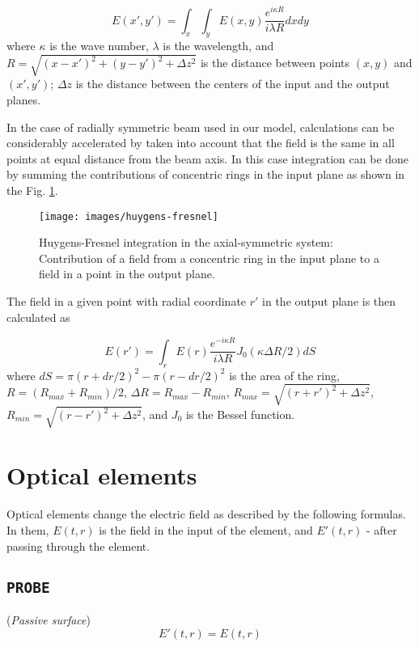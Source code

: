 \documentclass{report}
\begin{document}
\begin{equation}
E(x', y') = \int_x\int_y E(x,y) \frac{e^{i\kappa R}}{i\lambda R} dx dy
\end{equation}
where $\kappa$ is the wave number, $\lambda$ is the wavelength, and $R=\sqrt{(x-x')^2+(y-y')^2+\Delta z^2}$ is the distance between points $(x,y)$ and $(x',y')$; $\Delta z$ is the distance between the centers of the input and the output planes.

In the case of radially symmetric beam used in our model, calculations can be considerably accelerated by taken into account that the field is the same in all points at equal distance from the beam axis. In this case integration can be done by summing the contributions of concentric rings in the input plane as shown in the Fig. \ref{fig:Huygens-Fresnel}.

\begin{figure}[ht]
\centering
\texttt{[image: images/huygens-fresnel]}
\caption{Huygens-Fresnel integration in the axial-symmetric system: Contribution of a field from a concentric ring in the input plane to a field in a point in the output plane.}\label{fig:Huygens-Fresnel}
\end{figure}

The field in a given point with radial coordinate $r'$ in the output plane is then calculated as

\begin{equation}
E(r') = \int_{r}E(r)\frac{e^{-i\kappa R}}{i\lambda R} J_0(\kappa \Delta R/2) dS
\end{equation}
where $dS = \pi(r+dr/2)^2-\pi(r-dr/2)^2$ is the area of the ring, $R=(R_{max}+R_{min})/2$, $\Delta R=R_{max}-R_{min}$, $R_{max}=\sqrt{(r+r')^2+\Delta z^2}$, $R_{min}=\sqrt{(r-r')^2+\Delta z^2}$, and $J_0$ is the Bessel function.

\section{Optical elements}
Optical elements change the electric field as described by the following formulas. In them, $E(t,r)$ is the field in the input of the element, and $E'(t,r)$ - after passing through the element.

\subsection*{\texttt{PROBE}}
(\textit{Passive surface})
\begin{equation}
E'(t,r) = E(t,r)
\end{equation}
\end{document}
